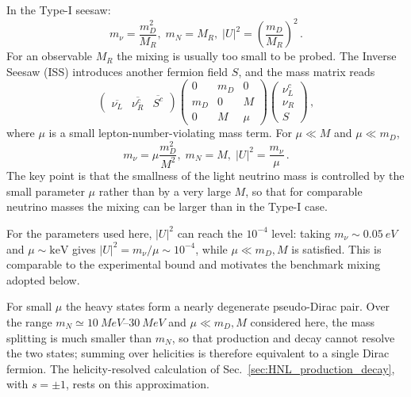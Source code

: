 \documentclass{ws-ijmpa}
\begin{document}
In the Type-I seesaw:\cite{minkowski1977mu,yanagida1980horizontal,gellmann2013complexspinorsunifiedtheories,glashow1980future}
\begin{equation}
  m_\nu = \frac{m_D^2}{M_R}, \; m_N = M_R, \; |U|^2 = \left( \frac{m_D}{M_R} \right)^2\,.
\end{equation}
For an
observable $M_R$ the mixing is usually too small to be probed. The Inverse
Seesaw (ISS) \cite{PhysRevD.34.1642, PhysRevLett.56.561, Boucenna_2014}
introduces another fermion field $S$, and the mass matrix reads
\begin{equation}
  \begin{pmatrix}
    \overline{\nu_L} & \overline{\nu_R^c} & \overline{S^c}
  \end{pmatrix}
  \begin{pmatrix}
    0   & m_D & 0   \\
    m_D & 0   & M   \\
    0   & M   & \mu
  \end{pmatrix}
  \begin{pmatrix}
    \nu_L^c \\
    \nu_R   \\
    S
  \end{pmatrix}\,,
\end{equation}
where $\mu$ is a small lepton-number-violating mass term.
For $\mu\ll M$ and $\mu\ll m_D$,
\begin{equation}
  m_\nu = \mu \frac{m_D^2}{M^2}, \; m_N = M, \; |U|^2 = \frac{m_\nu}{\mu}\,.
\end{equation}
The key point is that the smallness of the light neutrino mass is controlled
by the small parameter $\mu$ rather than by a very large $M$, so that for
comparable neutrino masses the mixing can be larger than in the Type-I case.

For the parameters used here, $|U|^2$ can reach the $10^{-4}$ level: taking
$m_\nu \sim \qty{0.05}{eV}$ and $\mu \sim \mathrm{keV}$ gives
$|U|^2=m_\nu/\mu\sim10^{-4}$, while $\mu\ll m_D,M$ is satisfied. This is
comparable to the experimental bound\cite{bryman2019constraints} and
motivates the benchmark mixing adopted below.

For small $\mu$ the heavy states form a nearly degenerate pseudo-Dirac pair.\cite{Das_2013,Deppisch_2015}
Over the range $m_N \simeq \qtyrange{10}{30}{MeV}$ and $\mu \ll m_D,M$
considered here, the mass splitting is much smaller than $m_N$, so that
production and decay cannot resolve the two states; summing over helicities
is therefore equivalent to a single Dirac fermion. The helicity-resolved
calculation of Sec.~\ref{sec:HNL_production_decay}, with $s = \pm 1$, rests on
this approximation.
\end{document}
